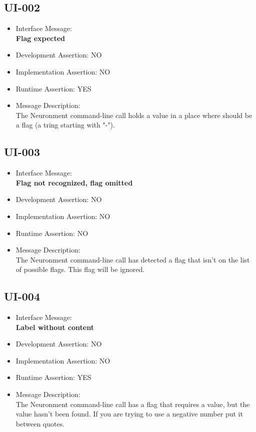 \subsection{UI-002}
\begin{itemize}
  \item Interface Message:\\[1em]
    \textbf{Flag expected}
  \item Development Assertion: NO
  \item Implementation Assertion: NO
  \item Runtime Assertion: YES
  \item Message Description:\\[1em]
    The Neuronment command-line call holds a value in a place where should be a flag (a tring starting with "-").
\end{itemize}

\subsection{UI-003}
\begin{itemize}
  \item Interface Message:\\[1em]
    \textbf{Flag not recognized, flag omitted}
  \item Development Assertion: NO
  \item Implementation Assertion: NO
  \item Runtime Assertion: NO
  \item Message Description:\\[1em]
    The Neuronment command-line call has detected a flag that isn't on the list of possible flags. This flag will be ignored.
\end{itemize}

\subsection{UI-004}
\begin{itemize}
  \item Interface Message:\\[1em]
    \textbf{Label without content}
  \item Development Assertion: NO
  \item Implementation Assertion: NO
  \item Runtime Assertion: YES
  \item Message Description:\\[1em]
    The Neuronment command-line call has a flag that requires a value, but the value hasn't been found. If you are trying to use a negative number put it between quotes.
\end{itemize}

